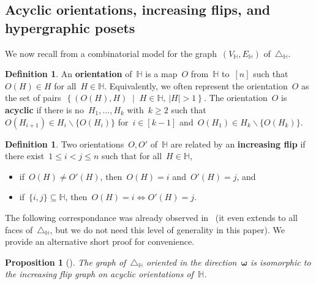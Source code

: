 \documentclass[reqno]{amsart}
\newtheorem{proposition}[theorem]{Proposition}
\theoremstyle{definition}
\newtheorem{definition}[theorem]{Definition}
\renewcommand{\b}[1]{\boldsymbol{#1}} %
\newcommand{\set}[2]{\left\{ #1 \;\middle|\; #2 \right\}} %
\newcommand{\ssm}{\smallsetminus} %
\newcommand{\defn}[1]{\textbf{\textsf{\color{PineGreen} #1}}} %
\newcommand{\HH}{\mathbb H}  %
\begin{document}

\subsection{Acyclic orientations, increasing flips, and hypergraphic posets} 
\label{subsec:P_H}

We now recall from \cite[Thm.~2.18]{BenedettiBergeronMachacek} a combinatorial model for the graph~$(V_\HH, E_\HH)$ of~$\triangle_\HH$.

\begin{definition}
\label{def:acyclicOrientation}
An \defn{orientation} of~$\HH$ is a map~$O$ from~$\HH$ to~$[n]$ such that~$O(H) \in H$ for all~${H \in \HH}$.
Equivalently, we often represent the orientation~$O$ as the set of pairs~$\set{(O(H),H)}{H \in \HH, \, |H| > 1}$.
The orientation~$O$ is \defn{acyclic} if there is no~$H_1, \dots, H_k$ with~$k \ge 2$ such that~$O(H_{i+1}) \in H_i \ssm \{O(H_i)\}$ for~$i \in [k-1]$ and~$O(H_1) \in H_k \ssm \{O(H_k)\}$.
\end{definition}

\begin{definition}
\label{def:flip}
Two orientations~$O, O'$ of~$\HH$ are related by an \defn{increasing flip} if there exist~${1 \le i < j \le n}$ such that for all~$H \in \HH$, 
\begin{itemize}
\item if~$O(H) \ne O'(H)$, then~$O(H) = i$ and~$O'(H) = j$, and
\item if~$\{i,j\} \subseteq \HH$, then~$O(H) = i \iff O'(H) = j$.
\end{itemize}
\end{definition}

The following correspondance was already observed in~\cite[Thm.~2.18]{BenedettiBergeronMachacek} (it even extends to all faces of~$\triangle_\HH$, but we do not need this level of generality in this paper).
We provide an alternative short proof for convenience.

\begin{proposition}[{\cite[Thm.~2.18]{BenedettiBergeronMachacek}}]\label{prop:Hgraph}
The graph of~$\triangle_\HH$ oriented in the direction~$\b{\omega}$ is isomorphic to the increasing flip graph on acyclic orientations of~$\HH$.
\end{proposition}
\end{document}
